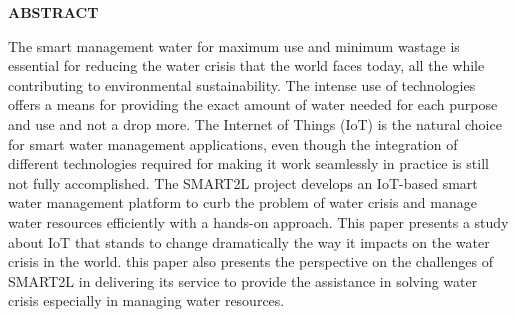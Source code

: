\documentclass[12pt,times,a4paper]{report}
\renewcommand{\baselinestretch}{1.5}
\begin{document}





\newpage













\newpage
\renewcommand{\baselinestretch}{1.5}

\begin{center}
{\fontsize{14}{12} \bf ABSTRACT}\\

\begin{enumerate}
\begin{normalsize}
\vspace{0.4in}
              The smart management water for maximum use and minimum wastage is essential for reducing the water crisis that the world faces today, all the while contributing to environmental sustainability. The intense use of technologies offers a means for providing the exact amount of water needed for each purpose and use and not a drop more. 
The Internet of Things (IoT) is the natural choice for smart water management applications, even though the integration of different technologies required for making it work seamlessly in practice is still not fully accomplished. The SMART2L project develops an IoT-based smart water management platform to curb the problem of water crisis and manage water resources efficiently with a hands-on approach. 
This paper presents a study about IoT that stands to change dramatically the way it impacts on the water crisis in the world. this paper also presents the perspective on the challenges of SMART2L in delivering its service to provide the assistance in solving water crisis especially in managing water resources.
\\

\end{normalsize}
\end{enumerate}
\end{center}
\end{document}

